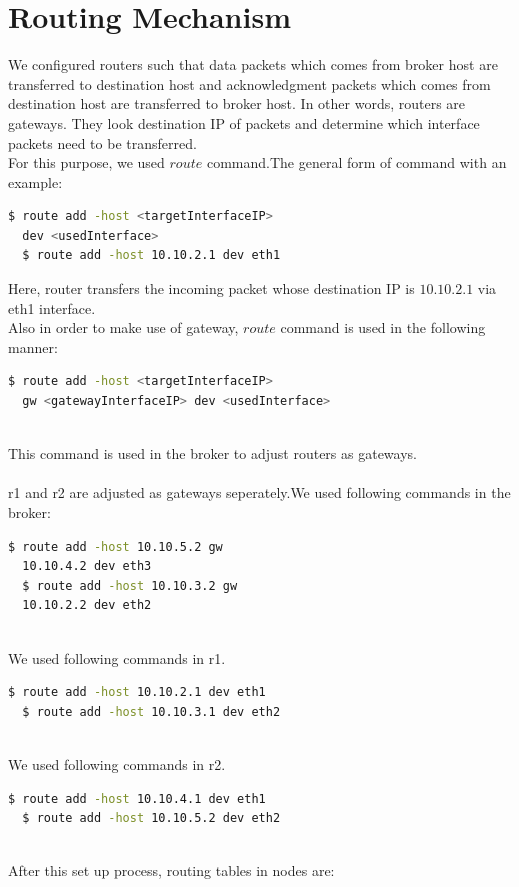 \documentclass[conference]{IEEEtran}
\begin{document}
\section{Routing Mechanism}
We configured routers such that data packets which comes from broker host are transferred to destination host and acknowledgment packets which comes from destination host are transferred to broker host. In other words, routers are gateways. They look destination IP of packets and determine which interface packets need to be transferred.\\
For this purpose, we used $route$ command.The general form of command with an example:\\
\begin{lstlisting}[language=bash]
  $ route add -host <targetInterfaceIP>
  dev <usedInterface>
  $ route add -host 10.10.2.1 dev eth1
\end{lstlisting}
Here, router transfers the incoming packet whose destination IP is $10.10.2.1$ via eth1 interface.\\
Also in order to make use of gateway, $route$ command is used in the following manner:
\begin{lstlisting}[language=bash]
  $ route add -host <targetInterfaceIP> 
  gw <gatewayInterfaceIP> dev <usedInterface>
\end{lstlisting}\\
This command is used in the broker to adjust routers as gateways.\\
\\
r1 and r2 are adjusted as gateways seperately.We used following commands in the broker:
\begin{lstlisting}[language=bash]
  $ route add -host 10.10.5.2 gw 
  10.10.4.2 dev eth3
  $ route add -host 10.10.3.2 gw 
  10.10.2.2 dev eth2
\end{lstlisting}\\
We used following commands in r1.
\begin{lstlisting}[language=bash]
  $ route add -host 10.10.2.1 dev eth1
  $ route add -host 10.10.3.1 dev eth2
\end{lstlisting}\\
We used following commands in r2.
\begin{lstlisting}[language=bash]
  $ route add -host 10.10.4.1 dev eth1
  $ route add -host 10.10.5.2 dev eth2
\end{lstlisting}
\\
After this set up process, routing tables in nodes are:\\
\end{document}
